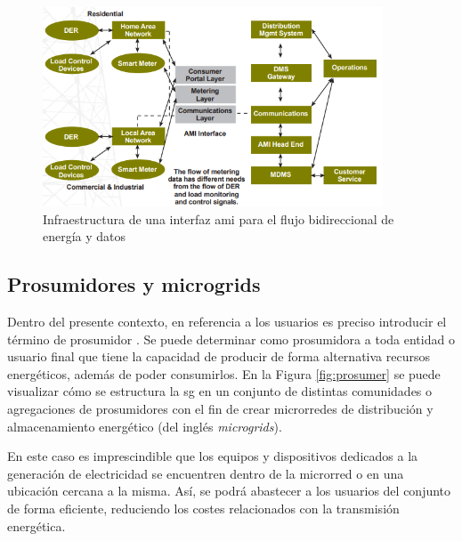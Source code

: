 \vspace{3mm}

\begin{figure}[H]
  \centering
  \includegraphics[width=0.9\textwidth]{img/teoria/bidir.png}
  \caption{Infraestructura de una interfaz \acrshort{ami} para el flujo bidireccional de energía y datos \cite{us}}
  \label{fig:bidireccional2}
\end{figure}


\subsection{Prosumidores y microgrids}
\label{sec:prosu}

Dentro del presente contexto, en referencia a los usuarios es preciso introducir el término de prosumidor \cite{transactive}. Se puede determinar como prosumidora a toda entidad o usuario final que tiene la capacidad de producir de forma alternativa recursos energéticos, además de poder consumirlos. En la Figura \ref{fig:prosumer} se puede visualizar cómo se estructura la \gls{sg} en un conjunto de distintas comunidades o agregaciones de prosumidores con el fin de crear microrredes de distribución y almacenamiento energético (del inglés \textit{microgrids}).

\vspace{3mm}

En este caso es imprescindible que los equipos y dispositivos dedicados a la generación de electricidad se encuentren dentro de la microrred o en una ubicación cercana a la misma. Así, se podrá abastecer a los usuarios del conjunto de forma eficiente, reduciendo los costes relacionados con la transmisión energética. 

\vspace{3mm}

